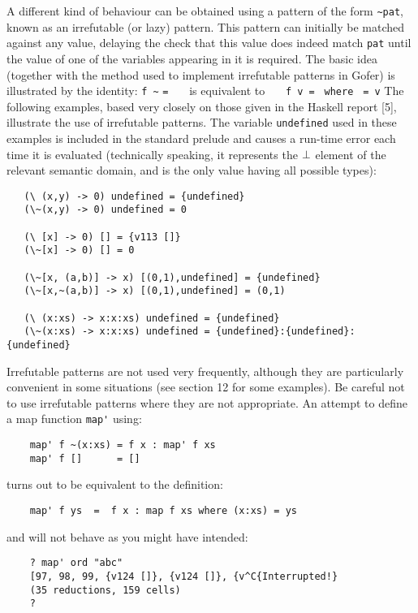 A different kind of behaviour can be obtained using a  pattern  of  the
form \verb"~pat", 
known as an irrefutable (or lazy) pattern.  This pattern can
initially be matched against any value, delaying the  check  that  this
value does indeed match \verb"pat" until the value of  one  of  the  variables
appearing in it is required.  The basic idea (together with the  method
used to implement irrefutable patterns in Gofer) is illustrated by  the
identity:
\BQ
    \verb"f ~" \verb"="  ~~~is equivalent to~~~
    \verb"f v = " \verb"where " \verb"= v"
\EQ
The following examples, based  very  closely  on  those  given  in  the
Haskell report [5], illustrate the use of  irrefutable  patterns.   The
variable \verb"undefined" used in these examples is included in the standard
prelude  and  causes  a  run-time  error  each  time  it  is  evaluated
(technically speaking, it represents the $\perp$ element of the relevant
semantic domain, and is the only value having all possible types):
\begin{verbatim}
   (\ (x,y) -> 0) undefined = {undefined}
   (\~(x,y) -> 0) undefined = 0

   (\ [x] -> 0) [] = {v113 []}
   (\~[x] -> 0) [] = 0

   (\~[x, (a,b)] -> x) [(0,1),undefined] = {undefined}
   (\~[x,~(a,b)] -> x) [(0,1),undefined] = (0,1)

   (\ (x:xs) -> x:x:xs) undefined = {undefined}
   (\~(x:xs) -> x:x:xs) undefined = {undefined}:{undefined}:{undefined}
\end{verbatim}
Irrefutable patterns are not used very frequently,  although  they  are
particularly convenient in some situations (see  section  12  for  some
examples).  Be careful not to use irrefutable patterns where  they  are
not appropriate.  An attempt to define a map function \verb"map'" using:
\begin{verbatim}
    map' f ~(x:xs) = f x : map' f xs
    map' f []      = []
\end{verbatim}
turns out to be equivalent to the definition:
\begin{verbatim}
    map' f ys  =  f x : map f xs where (x:xs) = ys
\end{verbatim}
and will not behave as you might have intended:
\begin{verbatim}
    ? map' ord "abc"
    [97, 98, 99, {v124 []}, {v124 []}, {v^C{Interrupted!}
    (35 reductions, 159 cells)
    ?
\end{verbatim}

